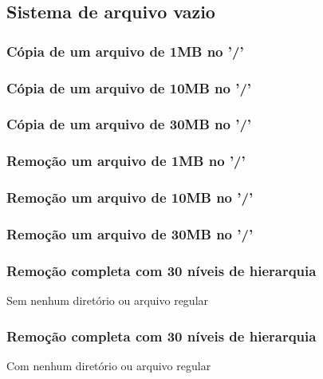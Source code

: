 \documentclass{beamer}
\begin{document}
\subsection{Sistema de arquivo vazio}
\begin{frame}
\frametitle{Cópia de um arquivo de 1MB no '/'} 

\justifying
\end{frame}


\begin{frame}
\frametitle{Cópia de um arquivo de 10MB no '/'} 

\justifying
\end{frame}


\begin{frame}
\frametitle{Cópia de um arquivo de 30MB no '/'} 

\justifying
\end{frame}


\begin{frame}
\frametitle{Remoção um arquivo de 1MB no '/'} 

\justifying
\end{frame}


\begin{frame}
\frametitle{Remoção um arquivo de 10MB no '/'} 

\justifying
\end{frame}


\begin{frame}
\frametitle{Remoção um arquivo de 30MB no '/'} 

\justifying
\end{frame}

\begin{frame}
\frametitle{Remoção completa com 30 níveis de hierarquia} 
Sem nenhum diretório ou arquivo regular
\justifying
\end{frame}


\begin{frame}
\frametitle{Remoção completa com 30 níveis de hierarquia} 
Com nenhum diretório ou arquivo regular
\justifying
\end{frame}
\end{document}
